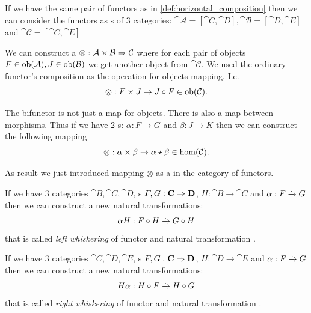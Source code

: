 \begin{remark}
 \label{rem:bifunctor_fun_cat}
If we have the same pair of functors as in
\cref{def:horizontal_composition} then we can consider the functors as
s of 3 categories: $\cat{\mathcal{A}} = \left[\cat{C},
  \cat{D}\right], \cat{\mathcal{B}} = \left[\cat{D},
  \cat{E}\right]$ and $\cat{\mathcal{C}} = \left[\cat{C},
  \cat{E}\right]$ 

  We can construct a  
  $\otimes: \mathbf{\mathcal{A}} \times \mathbf{\mathcal{B}} \Rightarrow \mathbf{\mathcal{C}}$
  where for each pair of objects $F \in \mathrm{ob}(\mathbf{\mathcal{A}}), J \in
  \mathrm{ob}(\mathbf{\mathcal{B}})$ we get another object from $\cat{\mathcal{C}}$.
  We used the ordinary functor's composition as the operation for
  objects mapping.
  I.e.
  \[
  \otimes: F \times J \to J \circ F \in \mathrm{ob}(\mathbf{\mathcal{C}}).
  \]
  
  The bifunctor is not just a map for objects. There is also a map
  between morphisms. Thus if we have 2 s:
  $\alpha : F \to G$ and $\beta : J \to K$ then we can construct the
  following mapping 
  \[
  \otimes: \alpha \times \beta \to \alpha \star \beta \in \mathrm{hom}(\mathbf{\mathcal{C}}).
  \]
  
  As result we just introduced mapping $\otimes$ as a
   in the category of functors.
\end{remark}

\begin{definition}
\label{def:lw}
If we have 3 categories $\cat{B}, \cat{C}, \cat{D}$, 
s $F,G: \mathbf{C} \Rightarrow \mathbf{D}$, $H: \cat{B} \to
\cat{C}$ and  
$\alpha: F \xrightarrow{.} G$ then we can construct a new natural
transformations:
\[
\alpha H : F \circ H \xrightarrow{.} G \circ H
\]
that is called \textit{left whiskering} of functor and natural
transformation \cite{nlab:whiskering}. 
\end{definition}

\begin{definition}
\label{def:rw}
If we have 3 categories $\cat{C}, \cat{D}, \cat{E}$, 
s $F,G: \mathbf{C} \Rightarrow \mathbf{D}$, $H: \cat{D} \to
\cat{E}$ and  
$\alpha: F \xrightarrow{.} G$ then we can construct a new natural 
transformations: 
\[
H \alpha : H \circ F \xrightarrow{.} H \circ G
\]
that is called \textit{right whiskering} of functor and natural
transformation \cite{nlab:whiskering}. 
\end{definition}

